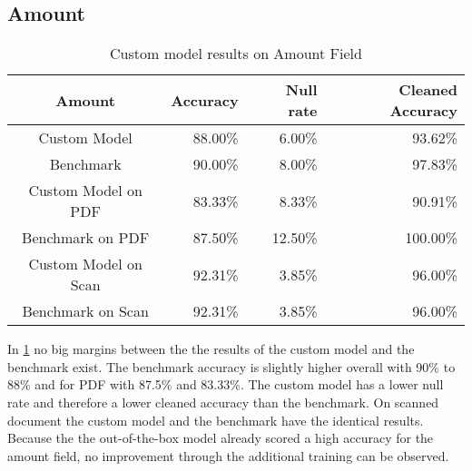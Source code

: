 \subsection*{Amount}
\begin{table}[ht]   %
    \centering
    \footnotesize
    \begin{tabular}{c|rrr} %
        \toprule    %
        Amount  & Accuracy  & Null rate & Cleaned Accuracy \\
        \midrule    %
        Custom Model               & 88.00\%   & 6.00\%   & 93.62\% \\
        Benchmark           & 90.00\%   & 8.00\%  & 97.83\%\\
        \midrule    %
        Custom Model on PDF        & 83.33\%   & 8.33\%  & 90.91\% \\
        Benchmark on PDF    & 87.50\%   & 12.50\%  & 100.00\% \\
        \midrule    %
        Custom Model on Scan       & 92.31\%  & 3.85\%   & 96.00\% \\
        Benchmark on Scan   & 92.31\%  & 3.85\%  & 96.00\% \\

        \bottomrule %
    \end{tabular}
    \caption{Custom model results on Amount Field}
    \label{table:Model_Bench_Amount}
\end{table}

In \cref{table:Model_Bench_Amount} no big margins between the the results of the custom model and the benchmark exist.
The benchmark accuracy is slightly higher overall with 90\% to 88\% and for PDF with 87.5\% and 83.33\%. 
The custom model has a lower null rate and therefore a lower cleaned accuracy than the benchmark.
On scanned document the custom model and the benchmark have the identical results.
Because the the out-of-the-box model already scored a high accuracy for the amount field, no improvement through the additional training can be observed.

